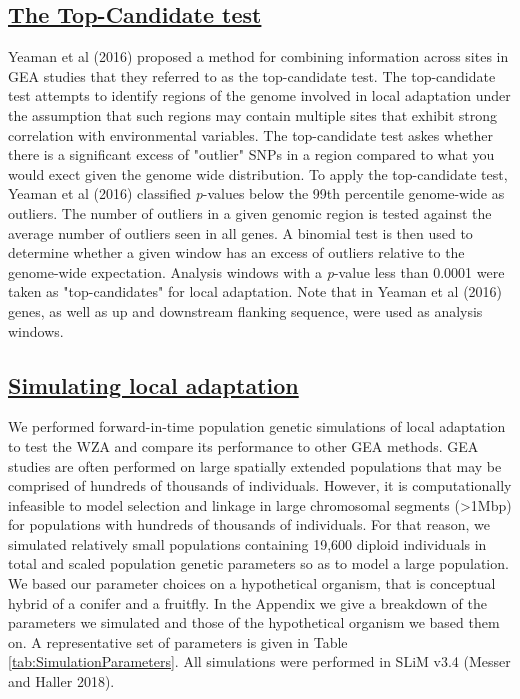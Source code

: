 \documentclass[11pt,twoside,lineno]{GSA_format}
\begin{document}
\subsection{\underline{The Top-Candidate test}} 

Yeaman et al (2016) proposed a method for combining information across sites in GEA studies that they referred to as the top-candidate test. The top-candidate test attempts to identify regions of the genome involved in local adaptation under the assumption that such regions may contain multiple sites that exhibit strong correlation with environmental variables. The top-candidate test askes whether there is a significant excess of "outlier" SNPs in a region compared to what you would exect given the genome wide distribution. To apply the top-candidate test, Yeaman et al (2016) classified \textit{p}-values below the 99th percentile genome-wide as outliers. The number of outliers in a given genomic region is tested against the average number of outliers seen in all genes. A binomial test is then used to determine whether a given window has an excess of outliers relative to the genome-wide expectation. Analysis windows with a \textit{p}-value less than 0.0001 were taken as "top-candidates" for local adaptation. Note that in Yeaman et al (2016) genes, as well as up and downstream flanking sequence, were used as analysis windows. 


\subsection{\underline{Simulating local adaptation}} 

We performed forward-in-time population genetic simulations of local adaptation to test the WZA and compare its performance to other GEA methods. GEA studies are often performed on large spatially extended populations that may be comprised of hundreds of thousands of individuals. However, it is computationally infeasible to model selection and linkage in large chromosomal segments (>1Mbp) for populations with hundreds of thousands of individuals. For that reason, we simulated relatively small populations containing 19,600 diploid individuals in total and scaled population genetic parameters so as to model a large population. We based our parameter choices on a hypothetical organism, that is conceptual hybrid of a conifer and a fruitfly. In the Appendix we give a breakdown of the parameters we simulated and those of the hypothetical organism we based them on. A representative set of parameters is given in Table \ref{tab:SimulationParameters}. All simulations were performed in SLiM v3.4 (Messer and Haller 2018). \\
\end{document}
